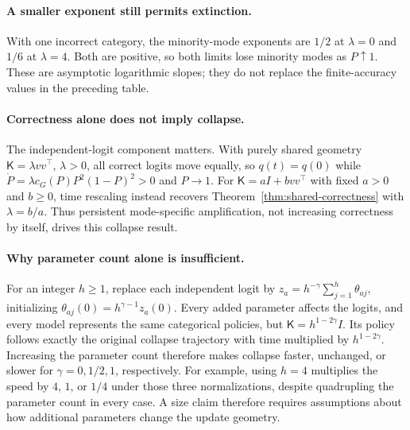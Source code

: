 \documentclass{article}
\newcommand{\1}{\mathbf 1}
\theoremstyle{remark}
\theoremstyle{definition}
\theoremstyle{plain}
\begin{document}
\paragraph{A smaller exponent still permits extinction.}
With one incorrect category, the minority-mode exponents are $1/2$ at
$\lambda=0$ and $1/6$ at $\lambda=4$. Both are positive, so both limits
lose minority modes as $P\uparrow1$. These are asymptotic logarithmic slopes;
they do not replace the finite-accuracy values in the preceding table.

\paragraph{Correctness alone does not imply collapse.}
The independent-logit component matters. With purely shared geometry
$\mathsf K=\lambda vv^\top$, $\lambda>0$, all correct logits move equally,
so $q(t)=q(0)$ while
$\dot P=\lambda c_G(P)P^2(1-P)^2>0$ and $P\to1$.
For $\mathsf K=aI+bvv^\top$ with fixed $a>0$ and $b\ge0$, time rescaling
instead recovers Theorem~\ref{thm:shared-correctness} with $\lambda=b/a$.
Thus persistent mode-specific amplification, not increasing correctness by
itself, drives this collapse result.

\paragraph{Why parameter count alone is insufficient.}
For an integer $h\ge1$, replace each independent logit by
$z_a=h^{-\gamma}\sum_{j=1}^h\theta_{aj}$, initializing
$\theta_{aj}(0)=h^{\gamma-1}z_a(0)$. Every added parameter affects the logits,
and every model represents the same categorical policies, but
$\mathsf K=h^{1-2\gamma}I$. Its policy follows exactly the original collapse
trajectory with time multiplied by $h^{1-2\gamma}$. Increasing the parameter
count therefore makes collapse faster, unchanged, or slower for
$\gamma=0,1/2,1$, respectively. For example, using $h=4$ multiplies the speed by $4$, $1$, or $1/4$
under those three normalizations, despite quadrupling the parameter count
in every case. A size claim therefore requires assumptions about how
additional parameters change the update geometry.
\end{document}
